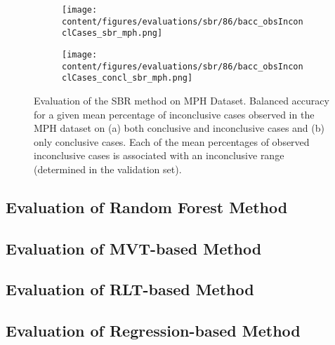 \begin{figure}[t]
  \begin{subfigure}{0.9\textwidth}
    \centering
    \texttt{[image: content/figures/evaluations/sbr/86/bacc\_obsInconclCases\_sbr\_mph.png]}
    \subcaption{}
    \label{fig:bacc_obsInconclCases_sbr_mph}
  \end{subfigure}
  \hfill
  \begin{subfigure}{0.9\textwidth}
    \centering
    \texttt{[image: content/figures/evaluations/sbr/86/bacc\_obsInconclCases\_concl\_sbr\_mph.png]}
    \subcaption{}
    \label{fig:bacc_obsInconclCases_concl_sbr_mph}
  \end{subfigure}

  \caption{Evaluation of the SBR method on MPH Dataset.
  Balanced accuracy for a given mean percentage of inconclusive cases observed in the MPH dataset on 
  (a) both conclusive and inconclusive cases and (b) only conclusive cases. 
  Each of the mean percentages of observed inconclusive cases is associated 
  with an inconclusive range (determined in the validation set). }
  \label{fig:bacc_obsInconclCases_sbr_mph_full}
\end{figure}




\subsection{Evaluation of Random Forest Method}
\label{subsec:eval_rfc}


\subsection{Evaluation of MVT-based Method}
\label{subsec:eval_mvt}


\subsection{Evaluation of RLT-based Method}
\label{subsec:eval_rlt}


\subsection{Evaluation of Regression-based Method}
\label{subsec:eval_regression}


